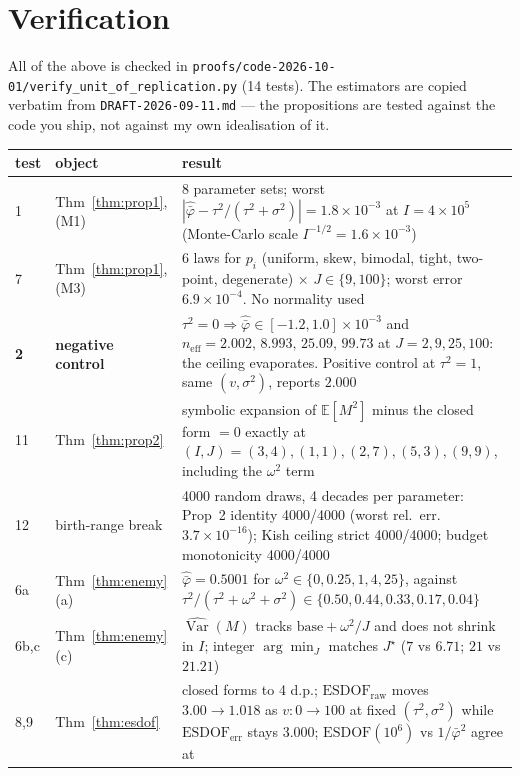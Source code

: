 \documentclass[11pt]{article}
\theoremstyle{plain}
\theoremstyle{definition}
\theoremstyle{remark}
\newcommand{\Var}{\operatorname{Var}}
\newcommand{\E}{\mathbb{E}}
\newcommand{\pb}{\bar{\varphi}}
\newcommand{\neff}{n_{\mathrm{eff}}}
\begin{document}
\section{Verification}

All of the above is checked in
\texttt{proofs/code-2026-10-01/verify\_unit\_of\_replication.py} (14 tests). The estimators are
copied verbatim from \texttt{DRAFT-2026-09-11.md} --- the propositions are tested against the code
you ship, not against my own idealisation of it.

\begin{center}
\begin{tabular}{@{}llp{6.4cm}@{}}
\toprule
test & object & result \\
\midrule
1 & Thm~\ref{thm:prop1}, (M1) & 8 parameter sets; worst $|\hat{\pb}-\tau^2/(\tau^2+\sigma^2)|
= 1.8\times10^{-3}$ at $I=4\times10^5$ (Monte-Carlo scale $I^{-1/2}=1.6\times10^{-3}$) \\
7 & Thm~\ref{thm:prop1}, (M3) & 6 laws for $p_i$ (uniform, skew, bimodal, tight, two-point,
degenerate) $\times$ $J\in\{9,100\}$; worst error $6.9\times10^{-4}$. No normality used \\
\textbf{2} & \textbf{negative control} & $\tau^2=0 \Rightarrow \hat{\pb}\in[-1.2,1.0]\times10^{-3}$
and $\neff = 2.002,\,8.993,\,25.09,\,99.73$ at $J=2,9,25,100$: the ceiling evaporates. Positive
control at $\tau^2=1$, same $(v,\sigma^2)$, reports $2.000$ \\
11 & Thm~\ref{thm:prop2} & symbolic expansion of $\E[M^2]$ minus the closed form $=0$ exactly at
$(I,J)=(3,4),(1,1),(2,7),(5,3),(9,9)$, including the $\omega^2$ term \\
12 & birth-range break & 4000 random draws, 4 decades per parameter: Prop~2 identity 4000/4000
(worst rel.\ err.\ $3.7\times10^{-16}$); Kish ceiling strict 4000/4000; budget monotonicity
4000/4000 \\
6a & Thm~\ref{thm:enemy}(a) & $\hat{\pb}=0.5001$ for $\omega^2\in\{0,0.25,1,4,25\}$, against
$\tau^2/(\tau^2+\omega^2+\sigma^2)\in\{0.50,0.44,0.33,0.17,0.04\}$ \\
6b,c & Thm~\ref{thm:enemy}(c) & $\widehat{\Var}(M)$ tracks $\text{base}+\omega^2/J$ and does not
shrink in $I$; integer $\arg\min_J$ matches $J^\star$ ($7$ vs $6.71$; $21$ vs $21.21$) \\
8,9 & Thm~\ref{thm:esdof} & closed forms to 4 d.p.; $\mathrm{ESDOF}_{\mathrm{raw}}$ moves
$3.00\to1.018$ as $v:0\to100$ at fixed $(\tau^2,\sigma^2)$ while
$\mathrm{ESDOF}_{\mathrm{err}}$ stays $3.000$; $\mathrm{ESDOF}(10^6)$ vs $1/\pb^2$ agree at

\end{tabular}
\end{center}
\end{document}
